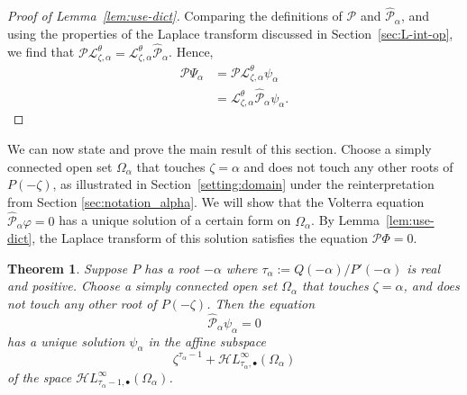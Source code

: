 \documentclass{article}
\theoremstyle{definition}
\theoremstyle{plain}
\newtheorem{theorem}{Theorem}
\newcommand{\laplace}{\mathcal{L}}
\newcommand{\singexp}[2]{\mathcal{H}L^\infty_{#1, #2}}
\newcommand{\singexpalg}[1]{\singexp{#1}{\bullet}}
\newcommand{\domain}{\Omega}
\begin{document}
\begin{proof}[Proof of Lemma~\ref{lem:use-dict}]
Comparing the definitions of $\mathcal{P}$ and $\hat{\mathcal{P}}_\alpha$, and using the properties of the Laplace transform discussed in Section~\ref{sec:L-int-op}, we find that $\mathcal{P} \laplace_{\zeta,\alpha}^\theta = \laplace_{\zeta,\alpha}^\theta \hat{\mathcal{P}}_\alpha$. Hence,
\begin{align*}
\mathcal{P}\Psi_\alpha & = \mathcal{P}\laplace_{\zeta,\alpha}^{\theta}\psi_\alpha \\
& = \laplace_{\zeta,\alpha}^{\theta}\hat{\mathcal{P}}_\alpha\psi_\alpha.
\end{align*}
\end{proof}

We can now state and prove the main result of this section. Choose a simply connected open set $\domain_\alpha$ that touches $\zeta = \alpha$ and does not touch any other roots of $P(-\zeta)$, as illustrated in Section~\ref{setting:domain} under the reinterpretation from Section \ref{sec:notation_alpha}. We will show that the Volterra equation $\hat{\mathcal{P}}_\alpha \varphi = 0$ has a unique solution of a certain form on $\domain_\alpha$. By Lemma~\ref{lem:use-dict}, the Laplace transform of this solution satisfies the equation $\mathcal{P}\Phi = 0$.
\begin{theorem}\label{thm:example}
Suppose $P$ has a root $-\alpha$ where $\tau_\alpha := Q(-\alpha)/P'(-\alpha)$ is real and positive. Choose a simply connected open set $\domain_\alpha$ that touches
$\zeta = \alpha$, and does not touch any other root of $P(-\zeta)$. Then the equation
\[ \hat{\mathcal{P}}_\alpha \psi_\alpha = 0 \]
has a unique solution $\psi_\alpha$ in the affine subspace
\[ \zeta^{\tau_\alpha-1} + \singexpalg{\tau_\alpha}(\domain_\alpha) \]
of the space $\singexpalg{\tau_\alpha-1}(\domain_\alpha)$.
\end{theorem}
\end{document}
